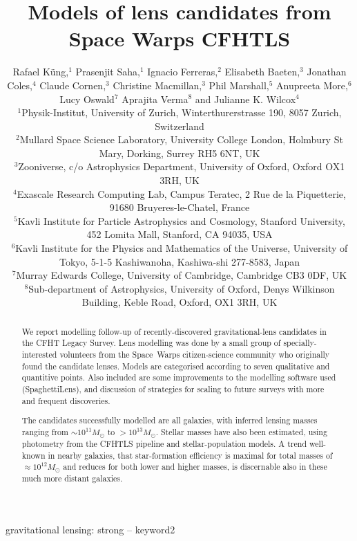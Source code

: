 \documentclass[fleqn,usenatbib]{mnras}
\title[Lens models for Space Warps CFHTLS]{Models of lens candidates from
  Space Warps CFHTLS}
\author[K\"ung et al]{Rafael K\"ung,$^{1}$
Prasenjit Saha,$^{1}$
Ignacio Ferreras,$^{2}$
Elisabeth Baeten,$^{3}$
\newauthor
Jonathan Coles,$^{4}$
Claude Cornen,$^{3}$
Christine Macmillan,$^{3}$
Phil Marshall,$^{5}$ 
\newauthor
Anupreeta More,$^{6}$
Lucy Oswald$^{7}$
Aprajita Verma$^{8}$
and Julianne K. Wilcox$^{4}$
%
\\
%
$^{1}$Physik-Institut, University of Zurich, Winterthurerstrasse 190, 8057 Zurich, Switzerland\\
$^{2}$Mullard Space Science Laboratory, University College London, Holmbury St Mary, Dorking, Surrey RH5 6NT, UK\\
$^{3}$Zooniverse, c/o Astrophysics Department, University of Oxford, Oxford OX1 3RH, UK \\
$^{4}$Exascale Research Computing Lab, Campus Teratec, 2 Rue de la Piquetterie, 91680 Bruyeres-le-Chatel, France\\
$^{5}$Kavli Institute for Particle Astrophysics and Cosmology, Stanford University, 452 Lomita Mall, Stanford, CA 94035, USA\\
$^{6}$Kavli Institute for the Physics and Mathematics of the Universe, University of Tokyo, 5-1-5 Kashiwanoha, Kashiwa-shi 277-8583, Japan\\
$^{7}$Murray Edwards College, University of Cambridge, Cambridge CB3 0DF, UK\\
$^{8}$Sub-department of Astrophysics, University of Oxford, Denys Wilkinson Building, Keble Road, Oxford, OX1 3RH, UK\\
}
\begin{document}
\label{firstpage}
\pagerange{\pageref{firstpage}--\pageref{lastpage}}
\maketitle

\begin{abstract}
We report modelling follow-up of recently-discovered
gravitational-lens candidates in the CFHT Legacy Survey.  Lens
modelling was done by a small group of specially-interested volunteers
from the Space~Warps citizen-science community who originally found
the candidate lenses.  Models are categorised according to seven
qualitative and quantitive points.  Also included are some
improvements to the modelling software used (SpaghettiLens),
and discussion of strategies for scaling to future surveys
with more and frequent discoveries.

The candidates successfully modelled are all galaxies, with inferred
lensing masses ranging from $\sim10^{11}M_\odot$ to $>10^{13}M_\odot$.
Stellar masses have also been estimated, using photometry from the
CFHTLS pipeline and stellar-population models.  A trend well-known
in nearby galaxies, that star-formation efficiency is maximal for
total masses of $\approx10^{12}M_\odot$ and reduces for both lower and
higher masses, is discernable also in these much more distant
galaxies.
\end{abstract}

\begin{keywords}
gravitational lensing: strong -- keyword2
\end{keywords}

\def\pwidth{.32\linewidth}

\def\includeten#1#2{
\texttt{[image: \#1ASW0007iwp\_4XBJWT3COV\#2]}%
\texttt{[image: \#1ASW0007xrs\_JHC3J2HYV7\#2]}%
\texttt{[image: \#1ASW0008pag\_5SXGXQYY6V\#2]}\\
\texttt{[image: \#1ASW0007k4r\_N7LTELSYTM\#2]}%
\texttt{[image: \#1ASW00096rm\_4Q3YCEWGLN\#2]}%
\texttt{[image: \#1ASW0001ld7\_OS3CYAKLRT\#2]}\\
\texttt{[image: \#1ASW0002asp\_5EKMWWVJHL\#2]}%
\texttt{[image: \#1ASW0008qsm\_TOFS7JNGEK\#2]}%
\texttt{[image: \#1ASW000619d\_011489\#2]}\\
}
\end{document}
